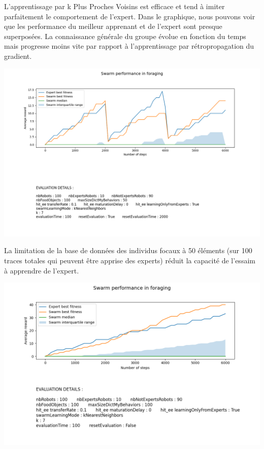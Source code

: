 \documentclass[a4paper, 12pt]{report}
\begin{document}
    L'apprentissage par k Plus Proches Voisins est efficace et tend à imiter parfaitement le comportement de l'expert.
    Dans le graphique, nous pouvons voir que les performance du meilleur apprenant et de l'expert sont presque superposées. La connaissance générale du groupe évolue en fonction du temps mais progresse moins vite par rapport à l'apprentissage par rétropropagation du gradient.
    
    \includegraphics[scale=0.5]{knn6000_50.png}
    
    La limitation de la base de données des individus focaux à 50 éléments (sur 100 traces totales qui peuvent être apprise des experts) réduit la capacité de l'essaim à apprendre de l'expert. 
    
    
    \includegraphics[scale=0.5]{knn6000_100_noReset.png}
        
\end{document}
